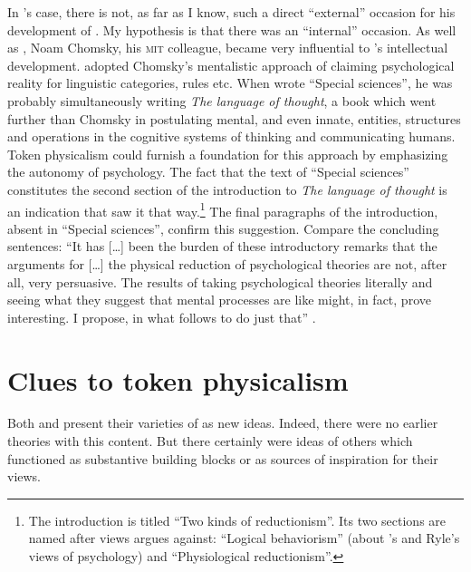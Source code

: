\documentclass[output=paper]{langscibook}
\begin{document}
In {\Fodor}'s case, there is not, as far as I know, such a direct ``external'' occasion for his development of . My hypothesis is that there was an ``internal'' occasion. As well as {\Putnam}, Noam Chomsky, his \textsc{mit} colleague, became very influential to {\Fodor}'s intellectual development. {\Fodor} adopted Chomsky's mentalistic approach of claiming psychological reality for linguistic categories, rules etc. When {\Fodor} wrote ``Special sciences'', he was probably simultaneously writing \emph{The language of thought}, a book which went further than Chomsky in postulating mental, and even innate, entities, structures and operations in the cognitive systems of thinking and communicating humans. Token physicalism could furnish a foundation for this approach by emphasizing the autonomy of psychology. The fact that the text of ``Special sciences'' constitutes the second section of the introduction to \emph{The language of thought} is an indication that {\Fodor} saw it that way.\footnote{The introduction is titled ``Two kinds of reductionism''. Its two sections are named after views {\Fodor} argues against: ``Logical behaviorism'' (about {\Wittgenstein}'s and Ryle's views of psychology) and ``Physiological reductionism''.} The final paragraphs of the introduction, absent in ``Special sciences'', confirm this suggestion. Compare the concluding sentences: ``It has […] been the burden of these introductory remarks that the arguments for […] the physical reduction of psychological theories are not, after all, very persuasive. The results of taking psychological theories literally and seeing what they suggest that mental processes are like might, in fact, prove interesting. I propose, in what follows to do just that'' \citep[26]{Fodor1975}.

\section{Clues to token physicalism}
\label{sec:elffers:clues}

Both {\Sapir} and {\Fodor} present their varieties of  as new ideas. Indeed, there were no earlier theories with this content. But there certainly were ideas of others which functioned as substantive building blocks or as sources of inspiration for their views.
\end{document}
